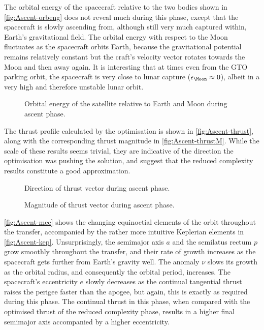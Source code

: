 The orbital energy of the spacecraft relative to the two bodies shown in \autoref{fig:Ascent-orbeng} does not reveal much during this phase, except that the spacecraft is slowly ascending from, although still very much captured within, Earth's gravitational field. The orbital energy with respect to the Moon fluctuates as the spacecraft orbits Earth, because the gravitational potential remains relatively constant but the craft's velocity vector rotates towards the Moon and then away again. It is interesting that at times even from the GTO parking orbit, the spacecraft is very close to lunar capture ($\epsilon_\Moon\approx0$), albeit in a very high and therefore unstable lunar orbit.

\begin{figure}
\centering
\def\svgwidth{\figurewidth}

\caption{Orbital energy of the satellite relative to Earth and Moon during ascent phase.} \label{fig:Ascent-orbeng}
\end{figure}

The thrust profile calculated by the optimisation is shown in \autoref{fig:Ascent-thrust}, along with the corresponding thrust magnitude in \autoref{fig:Ascent-thrustM}. While the scale of these results seems trivial, they are indicative of the direction the optimisation was pushing the solution, and suggest that the reduced complexity results constitute a good approximation. 

\begin{figure}
\centering
\def\svgwidth{\figurewidth}

\caption{Direction of thrust vector during ascent phase.} \label{fig:Ascent-thrust}
\end{figure}

\begin{figure}
\centering
\def\svgwidth{\figurewidth}

\caption{Magnitude of thrust vector during ascent phase.} \label{fig:Ascent-thrustM}
\end{figure}

\autoref{fig:Ascent-mee} shows the changing equinoctial elements of the orbit throughout the transfer, accompanied by the rather more intuitive Keplerian elements in \autoref{fig:Ascent-kep}. Unsurprisingly, the semimajor axis $a$ and the semilatus rectum $p$ grow smoothly throughout the transfer, and their rate of growth increases as the spacecraft gets further from Earth's gravity well. The anomaly $\nu$ slows its growth as the orbital radius, and consequently the orbital period, increases. The spacecraft's eccentricity $e$ slowly decreases as the continual tangential thrust raises the perigee faster than the apogee, but again, this is exactly as required during this phase. The continual thrust in this phase, when compared with the optimised thrust of the reduced complexity phase, results in a higher final semimajor axis accompanied by a higher eccentricity.


